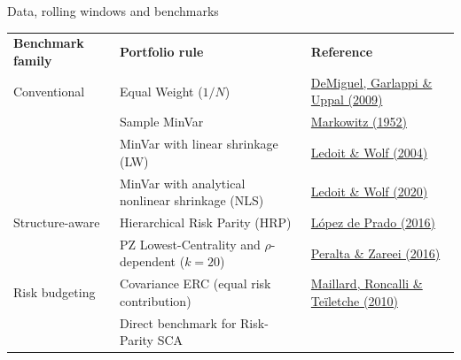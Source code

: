 \documentclass[9pt,aspectratio=169,t]{beamer}
\newcommand{\lab}[1]{{\color{slideaccent}\sffamily\bfseries #1}}
\begin{document}
\begin{frame}{Data, rolling windows and benchmarks}
{\fontsize{7.6}{9.6}\selectfont\renewcommand{\arraystretch}{1.04}
\setlength{\tabcolsep}{0pt}
\noindent\begin{tabular*}{\textwidth}{@{}l@{\extracolsep{\fill}}ll@{}}
\lab{Benchmark family} & \lab{Portfolio rule} & \lab{Reference}\\[.38mm]
Conventional & Equal Weight (\(1/N\)) & \href{https://doi.org/10.1093/rfs/hhm075}{DeMiguel, Garlappi \& Uppal (2009)}\\
 & Sample MinVar & \href{https://doi.org/10.1111/j.1540-6261.1952.tb01525.x}{Markowitz (1952)}\\
 & MinVar with linear shrinkage (LW) & \href{https://doi.org/10.1016/S0047-259X(03)00096-4}{Ledoit \& Wolf (2004)}\\
 & MinVar with analytical nonlinear shrinkage (NLS) & \href{https://doi.org/10.1214/19-AOS1921}{Ledoit \& Wolf (2020)}\\[.55mm]
Structure-aware & Hierarchical Risk Parity (HRP) & \href{https://doi.org/10.3905/jpm.2016.42.4.059}{L\'opez de Prado (2016)}\\
 & PZ Lowest-Centrality and \(\rho\)-dependent (\(k=20\)) & \href{https://doi.org/10.1016/j.jempfin.2016.06.003}{Peralta \& Zareei (2016)}\\[.55mm]
Risk budgeting & Covariance ERC (equal risk contribution) & \href{https://doi.org/10.3905/jpm.2010.36.4.060}{Maillard, Roncalli \& Te\"iletche (2010)}\\[-.12mm]
 & {\color{subtle}\fontsize{7.05}{8.5}\selectfont Direct benchmark for Risk-Parity SCA} &
\end{tabular*}\par}
\end{frame}
\endgroup
\endgroup

\newcommand{\scaPageLink}[2]{%
  \let\scaUnlinkedFrameNumber\insertframenumber
  \renewcommand{\insertframenumber}{%
    {\sffamily\bfseries\fontsize{6.65}{7.7}\selectfont\hyperlink{#1}{#2}}\hspace{4mm}%
    \scaUnlinkedFrameNumber}}
\end{document}

